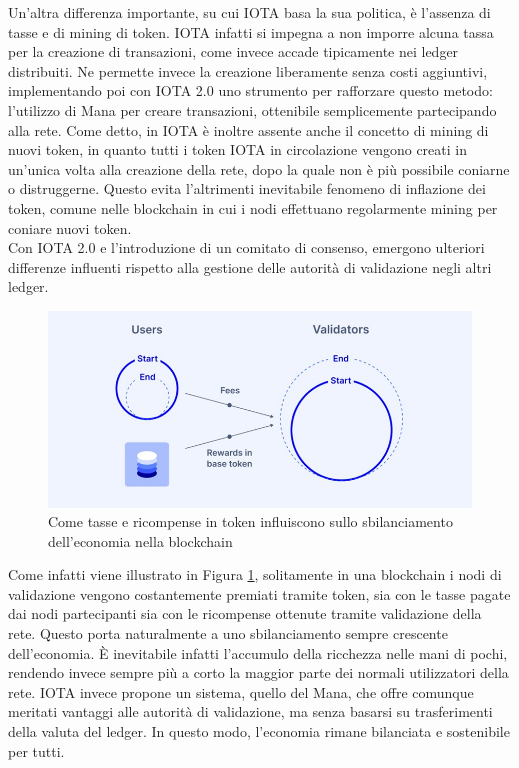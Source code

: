\documentclass[12pt,a4paper,openright,twoside]{report}
\begin{document}
Un'altra differenza importante, su cui IOTA basa la sua politica, è l'assenza di tasse e di mining di token. IOTA infatti si impegna a non imporre alcuna tassa per la creazione di transazioni, come invece accade tipicamente nei ledger distribuiti. Ne permette invece la creazione liberamente senza costi aggiuntivi, implementando poi con IOTA 2.0 uno strumento per rafforzare questo metodo: l'utilizzo di Mana per creare transazioni, ottenibile semplicemente partecipando alla rete. Come detto, in IOTA è inoltre assente anche il concetto di mining di nuovi token, in quanto tutti i token IOTA in circolazione vengono creati in un'unica volta alla creazione della rete, dopo la quale non è più possibile coniarne o distruggerne. Questo evita l'altrimenti inevitabile fenomeno di inflazione dei token, comune nelle blockchain in cui i nodi effettuano regolarmente mining per coniare nuovi token.\\
Con IOTA 2.0 e l'introduzione di un comitato di consenso, emergono ulteriori differenze influenti rispetto alla gestione delle autorità di validazione negli altri ledger.

\begin{figure}[h]
\begin{center}
\includegraphics[width=\textwidth]{figures/ledger_economy.jpg}
\caption[Arricchimento dei validatori]{Come tasse e ricompense in token influiscono sullo sbilanciamento dell'economia nella blockchain\footnotemark}\label{fig:ledger_economy}
\end{center}
\end{figure}
\label{manaconsensus}
Come infatti viene illustrato in Figura \ref{fig:ledger_economy}, solitamente in una blockchain i nodi di validazione vengono costantemente premiati tramite token, sia con le tasse pagate dai nodi partecipanti sia con le ricompense ottenute tramite validazione della rete. Questo porta naturalmente a uno sbilanciamento sempre crescente dell'economia. È inevitabile infatti l'accumulo della ricchezza nelle mani di pochi, rendendo invece sempre più a corto la maggior parte dei normali utilizzatori della rete. IOTA invece propone un sistema, quello del Mana, che offre comunque meritati vantaggi alle autorità di validazione, ma senza basarsi su trasferimenti della valuta del ledger. In questo modo, l'economia rimane bilanciata e sostenibile per tutti.
\end{document}
